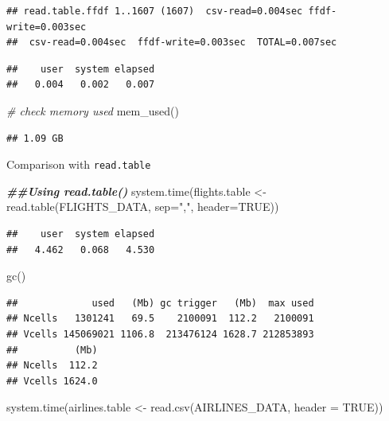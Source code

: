 \documentclass[
  12pt,
]{style/krantz}
\newenvironment{Shaded}{\begin{snugshade}}{\end{snugshade}}
\newcommand{\AttributeTok}[1]{\textcolor[rgb]{0.77,0.63,0.00}{#1}}
\newcommand{\CommentTok}[1]{\textcolor[rgb]{0.56,0.35,0.01}{\textit{#1}}}
\newcommand{\ConstantTok}[1]{\textcolor[rgb]{0.00,0.00,0.00}{#1}}
\newcommand{\DocumentationTok}[1]{\textcolor[rgb]{0.56,0.35,0.01}{\textbf{\textit{#1}}}}
\newcommand{\FunctionTok}[1]{\textcolor[rgb]{0.00,0.00,0.00}{#1}}
\newcommand{\NormalTok}[1]{#1}
\newcommand{\OtherTok}[1]{\textcolor[rgb]{0.56,0.35,0.01}{#1}}
\newcommand{\StringTok}[1]{\textcolor[rgb]{0.31,0.60,0.02}{#1}}
\begin{document}
\begin{verbatim}
## read.table.ffdf 1..1607 (1607)  csv-read=0.004sec ffdf-write=0.003sec
##  csv-read=0.004sec  ffdf-write=0.003sec  TOTAL=0.007sec
\end{verbatim}

\begin{verbatim}
##    user  system elapsed 
##   0.004   0.002   0.007
\end{verbatim}

\begin{Shaded}
\begin{Highlighting}[]
\CommentTok{\# check memory used}
\FunctionTok{mem\_used}\NormalTok{()}
\end{Highlighting}
\end{Shaded}

\begin{verbatim}
## 1.09 GB
\end{verbatim}

Comparison with \texttt{read.table}

\begin{Shaded}
\begin{Highlighting}[]
\DocumentationTok{\#\#Using read.table()}
\FunctionTok{system.time}\NormalTok{(flights.table }\OtherTok{\textless{}{-}} \FunctionTok{read.table}\NormalTok{(FLIGHTS\_DATA, }
                                        \AttributeTok{sep=}\StringTok{","}\NormalTok{,}
                                        \AttributeTok{header=}\ConstantTok{TRUE}\NormalTok{))}
\end{Highlighting}
\end{Shaded}

\begin{verbatim}
##    user  system elapsed 
##   4.462   0.068   4.530
\end{verbatim}

\begin{Shaded}
\begin{Highlighting}[]
\FunctionTok{gc}\NormalTok{()}
\end{Highlighting}
\end{Shaded}

\begin{verbatim}
##             used   (Mb) gc trigger   (Mb)  max used
## Ncells   1301241   69.5    2100091  112.2   2100091
## Vcells 145069021 1106.8  213476124 1628.7 212853893
##          (Mb)
## Ncells  112.2
## Vcells 1624.0
\end{verbatim}

\begin{Shaded}
\begin{Highlighting}[]
\FunctionTok{system.time}\NormalTok{(airlines.table }\OtherTok{\textless{}{-}} \FunctionTok{read.csv}\NormalTok{(AIRLINES\_DATA,}
                                       \AttributeTok{header =} \ConstantTok{TRUE}\NormalTok{))}
\end{Highlighting}
\end{Shaded}
\end{document}
